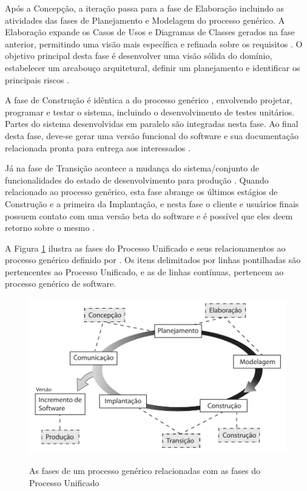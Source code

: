 Após a Concepção, a iteração passa para a fase de Elaboração incluindo as atividades das fases de Planejamento e Modelagem do processo genérico. A Elaboração expande os Casos de Usos e Diagramas de Classes gerados na fase anterior, permitindo uma visão mais específica e refinada sobre os requisitos \cite{pressman06}. O objetivo principal desta fase é desenvolver uma visão sólida do domínio, estabelecer um arcabouço arquitetural, definir um planejamento e identificar os principais riscos \cite{sommerville10}.

A fase de Construção é idêntica a do processo genérico \cite{pressman06}, envolvendo projetar, programar e testar o sistema, incluindo o desenvolvimento de testes unitários. Partes do sistema desenvolvidas em paralelo são integradas nesta fase. Ao final desta fase, deve-se gerar uma versão funcional do software e sua documentação relacionada pronta para entrega aos interessados \cite{sommerville10}. 

Já na fase de Transição acontece a mudança do sistema/conjunto de funcionalidades do estado de desenvolvimento para produção \cite{sommerville10}. Quando relacionado ao processo genérico, esta fase abrange os últimos estágios de Construção e a primeira da Implantação, e nesta fase o cliente e usuários finais possuem contato com uma versão beta do software e é possível que eles deem retorno sobre o mesmo  \cite{pressman06}.

A Figura \ref{fig:processo_unificado} ilustra as fases do Processo Unificado e seus relacionamentos ao processo genérico definido por . Os itens delimitados por linhas pontilhadas são pertencentes ao Processo Unificado, e as de linhas contínuas, pertencem ao processo genérico de software.

\begin{figure}[!h]
\centering
\caption{As fases de um processo genérico relacionadas com as fases do Processo Unificado}
\includegraphics{pdfs/img-processo-unificado.pdf}
\label{fig:processo_unificado} 
\end{figure}

